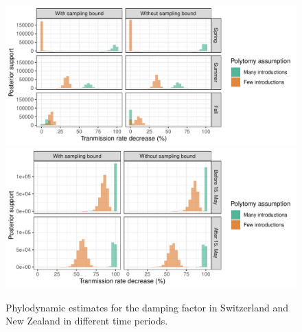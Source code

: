 \documentclass[9pt,twoside,lineno]{pnas-new}
\begin{document}
\begin{figure}[tbhp]
\centering
\includegraphics[width=\linewidth]{figures/CHE_contact_tracing_factor.pdf}
\includegraphics[width=\linewidth]{figures/NZL_contact_tracing_factor.pdf}
\caption{Phylodynamic estimates for the damping factor in Switzerland and New Zealand in different time periods.}  
\label{fig:DampingFactorResults}
\end{figure}
\newpage
\end{document}
